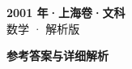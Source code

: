 \documentclass[zihao=-4, a4paper]{ctexart}
\begin{document}
\begin{center}
  {\Large\bfseries 2001 年·上海卷·文科}\\[4pt]
  {\large 数学 · 解析版}
\end{center}
\medskip
{}

\clearpage
{}
\begin{center}{\Large\bfseries 参考答案与详细解析}\end{center}
\medskip

\end{document}
